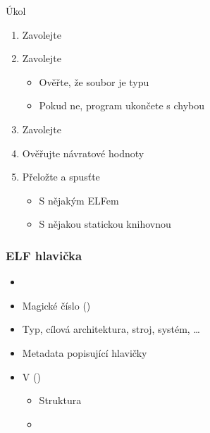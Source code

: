\begin{frame}{Úkol}

  \begin{enumerate}
    \item Zavolejte 

    \item Zavolejte 
    \begin{itemize}
      \item Ověřte, že soubor je typu 
      \item Pokud ne, program ukončete s chybou
    \end{itemize}

    \item Zavolejte 
    \item Ověřujte návratové hodnoty

    \item Přeložte a spusťte
    \begin{itemize}
      \item S nějakým ELFem
      \item S nějakou statickou knihovnou
    \end{itemize}
  \end{enumerate}

\end{frame}



\begin{frame}
  \frametitle{ELF hlavička}

  \begin{itemize}
    \item {}

    \pause

    \item Magické číslo ()

    \pause

    \item Typ, cílová architektura, stroj, systém, \dots

    \pause

    \item Metadata popisující hlavičky

    \pause

    \item V  ()
    \begin{itemize}
      \item Struktura 
      \item {}
    \end{itemize}
  \end{itemize}

\end{frame}

